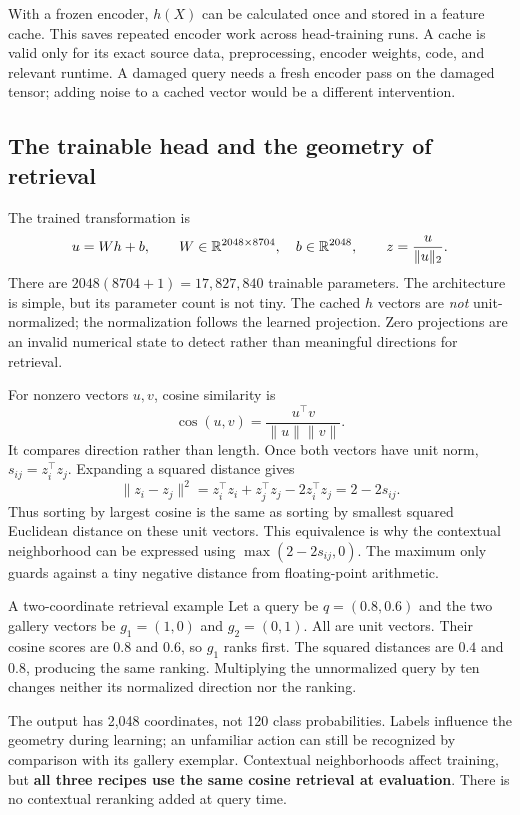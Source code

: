 With a frozen encoder, $h(X)$ can be calculated once and stored in a feature
cache. This saves repeated encoder work across head-training runs. A cache is
valid only for its exact source data, preprocessing, encoder weights, code,
and relevant runtime. A damaged query needs a fresh encoder pass on the damaged
tensor; adding noise to a cached vector would be a different intervention.

\subsection{The trainable head and the geometry of retrieval}
The trained transformation is
\[
 u=Wh+b,\qquad W\in\mathbb{R}^{2048\times8704},\quad b\in\mathbb{R}^{2048},
 \qquad z=\frac{u}{\lVert u\rVert_2}.
\]
There are $2048(8704+1)=17{,}827{,}840$ trainable parameters. The architecture
is simple, but its parameter count is not tiny. The cached $h$ vectors are
\emph{not} unit-normalized; the normalization follows the learned projection.
Zero projections are an invalid numerical state to detect rather than meaningful
directions for retrieval.

For nonzero vectors $u,v$, cosine similarity is
\[
 \cos(u,v)=\frac{u^\top v}{\lVert u\rVert\lVert v\rVert}.
\]
It compares direction rather than length. Once both vectors have unit norm,
$s_{ij}=z_i^\top z_j$. Expanding a squared distance gives
\[
 \lVert z_i-z_j\rVert^2
 =z_i^\top z_i+z_j^\top z_j-2z_i^\top z_j=2-2s_{ij}.
\]
Thus sorting by largest cosine is the same as sorting by smallest squared
Euclidean distance on these unit vectors. This equivalence is why the contextual
neighborhood can be expressed using $\max(2-2s_{ij},0)$. The maximum only guards
against a tiny negative distance from floating-point arithmetic.

\begin{concept}{A two-coordinate retrieval example}
Let a query be $q=(0.8,0.6)$ and the two gallery vectors be $g_1=(1,0)$ and
$g_2=(0,1)$. All are unit vectors. Their cosine scores are $0.8$ and $0.6$,
so $g_1$ ranks first. The squared distances are $0.4$ and $0.8$, producing
the same ranking. Multiplying the unnormalized query by ten changes neither
its normalized direction nor the ranking.
\end{concept}

The output has 2,048 coordinates, not 120 class probabilities. Labels influence
the geometry during learning; an unfamiliar action can still be recognized by
comparison with its gallery exemplar. Contextual neighborhoods affect training,
but \textbf{all three recipes use the same cosine retrieval at evaluation}.
There is no contextual reranking added at query time.

